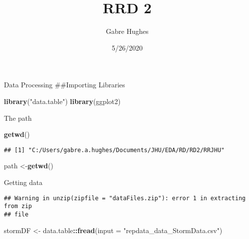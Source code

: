 \documentclass[]{article}
\title{RRD 2}
\author{Gabre Hughes}
\date{5/26/2020}
\newenvironment{Shaded}{\begin{snugshade}}{\end{snugshade}}
\newcommand{\DataTypeTok}[1]{\textcolor[rgb]{0.13,0.29,0.53}{#1}}
\newcommand{\KeywordTok}[1]{\textcolor[rgb]{0.13,0.29,0.53}{\textbf{#1}}}
\newcommand{\NormalTok}[1]{#1}
\newcommand{\OperatorTok}[1]{\textcolor[rgb]{0.81,0.36,0.00}{\textbf{#1}}}
\newcommand{\StringTok}[1]{\textcolor[rgb]{0.31,0.60,0.02}{#1}}
\begin{document}
\maketitle

Data Processing \#\#Importing Libraries

\begin{Shaded}
\begin{Highlighting}[]
\KeywordTok{library}\NormalTok{(}\StringTok{"data.table"}\NormalTok{)}
\KeywordTok{library}\NormalTok{(ggplot2)}
\end{Highlighting}
\end{Shaded}

The path

\begin{Shaded}
\begin{Highlighting}[]
\KeywordTok{getwd}\NormalTok{()}
\end{Highlighting}
\end{Shaded}

\begin{verbatim}
## [1] "C:/Users/gabre.a.hughes/Documents/JHU/EDA/RD/RD2/RRJHU"
\end{verbatim}

\begin{Shaded}
\begin{Highlighting}[]
\NormalTok{path <-}\KeywordTok{getwd}\NormalTok{()}
\end{Highlighting}
\end{Shaded}

Getting data

\begin{Shaded}
\end{Shaded}

\begin{verbatim}
## Warning in unzip(zipfile = "dataFiles.zip"): error 1 in extracting from zip
## file
\end{verbatim}

\begin{Shaded}
\begin{Highlighting}[]
\NormalTok{stormDF <-}\StringTok{ }\NormalTok{data.table}\OperatorTok{::}\KeywordTok{fread}\NormalTok{(}\DataTypeTok{input =} \StringTok{"repdata_data_StormData.csv"}\NormalTok{)}
\end{Highlighting}
\end{Shaded}
\end{document}
